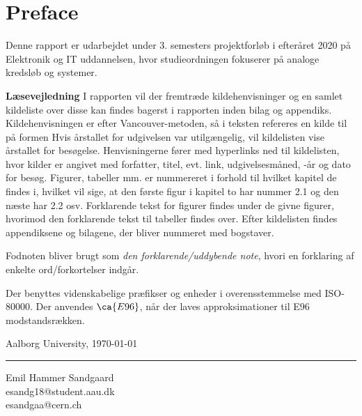\chapter*{Preface}

 Denne rapport er udarbejdet under 3. semesters projektforløb i efteråret 2020 på Elektronik og IT uddannelsen, hvor studieordningen fokuserer på analoge kredsløb og systemer.


\textbf{Læsevejledning}
 I rapporten vil der fremtræde kildehenvisninger og en samlet kildeliste over disse kan findes bagerst i rapporten inden bilag og appendiks.
 Kildehenvisningen er efter Vancouver-metoden, så i teksten refereres en kilde til på formen %
 Hvis årstallet for udgivelsen var utilgængelig, vil kildelisten vise årstallet for besøgelse. 
 Henvisningerne fører med hyperlinks ned til kildelisten, hvor kilder er angivet med forfatter, titel, evt. link, udgivelsesmåned, -år og dato for besøg.
 Figurer, tabeller mm. er nummereret i forhold til hvilket kapitel de findes i, hvilket vil sige, at den første figur i kapitel to har nummer 2.1 og den næste har 2.2 osv. Forklarende tekst for figurer findes under de givne figurer, hvorimod den forklarende tekst til tabeller findes over. Efter kildelisten findes appendiksene og bilagene, der bliver nummeret med bogstaver.

 Fodnoten bliver brugt som \textit{den forklarende/uddybende note}, hvori en forklaring af enkelte ord/forkortelser indgår.

 Der benyttes videnskabelige præfikser og enheder i overensstemmelse med ISO-80000.
 Der anvendes $\ca{E96}$, når der laves approksimationer til E96 modstandsrækken.

\vspace{\baselineskip}\hfill Aalborg University, \today
\vfill\noindent



\vspace{3\baselineskip}
\begin{center}
\begin{minipage}[b]{0.45\textwidth}
 \centering
 \rule{\textwidth}{0.5pt}
  Emil Hammer Sandgaard\\
 {\footnotesize esandg18@student.aau.dk}\\
 {\footnotesize esandgaa@cern.ch}
\end{minipage}
\end{center}
